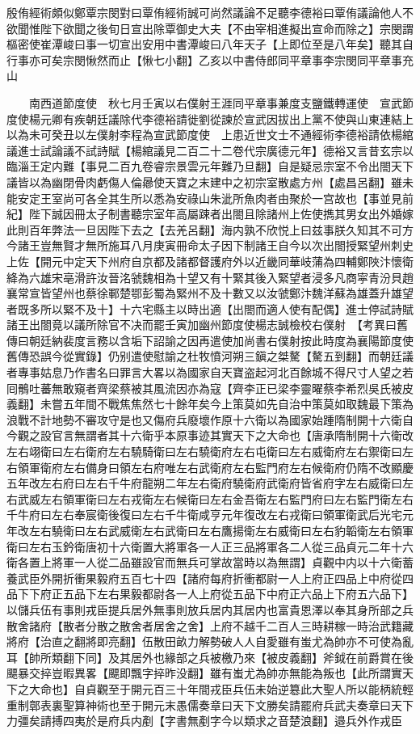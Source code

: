 殷侑經術頗似鄭覃宗閔對曰覃侑經術誠可尚然議論不足聽李德裕曰覃侑議論他人不欲聞惟陛下欲聞之後旬日宣出除覃御史大夫【不由宰相進擬出宣命而除之】宗閔謂樞密使崔潭峻曰事一切宣出安用中書潭峻曰八年天子【上即位至是八年矣】聽其自行事亦可矣宗閔愀然而止【愀七小翻】乙亥以中書侍郎同平章事李宗閔同平章事充山

　　南西道節度使　秋七月壬寅以右僕射王涯同平章事兼度支鹽鐵轉運使　宣武節度使楊元卿有疾朝廷議除代李德裕請徙劉從諫於宣武因拔出上黨不使與山東連結上以為未可癸丑以左僕射李程為宣武節度使　上患近世文士不通經術李德裕請依楊綰議進士試論議不試詩賦【楊綰議見二百二十二卷代宗廣德元年】德裕又言昔玄宗以臨淄王定内難【事見二百九卷睿宗景雲元年難乃旦翻】自是疑忌宗室不令出閤天下議皆以為幽閉骨肉虧傷人倫曏使天寶之末建中之初宗室散處方州【處昌呂翻】雖未能安定王室尚可各全其生所以悉為安祿山朱泚所魚肉者由聚於一宫故也【事並見前紀】陛下誠因冊太子制書聽宗室年高屬踈者出閤且除諸州上佐使擕其男女出外婚嫁此則百年弊法一旦因陛下去之【去羌呂翻】海内孰不欣悦上曰兹事朕久知其不可方今諸王豈無賢才無所施耳八月庚寅冊命太子因下制諸王自今以次出閤授緊望州刺史上佐【開元中定天下州府自京都及諸都督護府外以近畿同華岐蒲為四輔鄭陜汴懷衛絳為六雄宋亳滑許汝晉洺虢魏相為十望又有十緊其後入緊望者浸多凡商寜青汾貝趙襄常宣皆望州也蔡徐鄆楚鄂彭蜀為緊州不及十數又以汝虢鄭汴魏洋蘇為雄蓋升雄望者既多所以緊不及十】十六宅縣主以時出適【出閤而適人使有配偶】進士停試詩賦諸王出閤竟以議所除官不决而罷壬寅加幽州節度使楊志誠檢校右僕射　【考異曰舊傳曰朝廷納裴度言務以含垢下詔諭之因再遣使加尚書右僕射按此時度為襄陽節度使舊傳恐誤今從實錄】仍别遣使慰諭之杜牧憤河朔三鎭之桀驁【驁五到翻】而朝廷議者專事姑息乃作書名曰罪言大畧以為國家自天寶盗起河北百餘城不得尺寸人望之若囘鶻吐蕃無敢窺者齊梁蔡被其風流因亦為寇【齊李正已梁李靈曜蔡李希烈吳氏被皮義翻】未嘗五年間不戰焦焦然七十餘年矣今上策莫如先自治中策莫如取魏最下策為浪戰不計地勢不審攻守是也又傷府兵廢壞作原十六衛以為國家始踵隋制開十六衛自今觀之設官言無謂者其十六衛乎本原事迹其實天下之大命也【唐承隋制開十六衛改左右翊衛曰左右衛府左右驍騎衛曰左右驍衛府左右屯衛曰左右威衛府左右禦衛曰左右領軍衛府左右備身曰領左右府唯左右武衛府左右監門府左右候衛府仍隋不改顯慶五年改左右府曰左右千牛府龍朔二年左右衛府驍衛府武衛府皆省府字左右威衛曰左右武威左右領軍衛曰左右戎衛左右候衛曰左右金吾衛左右監門府曰左右監門衛左右千牛府曰左右奉宸衛後復曰左右千牛衛咸亨元年復改左右戎衛曰領軍衛武后光宅元年改左右驍衛曰左右武威衛左右武衛曰左右鷹揚衛左右威衛曰左右豹韜衛左右領軍衛曰左右玉鈐衛唐初十六衛置大將軍各一人正三品將軍各二人從三品貞元二年十六衛各置上將軍一人從二品雖設官而無兵可掌故當時以為無謂】貞觀中内以十六衛蓄養武臣外開折衝果毅府五百七十四【諸府每府折衝都尉一人上府正四品上中府從四品下下府正五品下左右果毅都尉各一人上府從五品下中府正六品上下府五六品下】以儲兵伍有事則戎臣提兵居外無事則放兵居内其居内也富貴恩澤以奉其身所部之兵散舍諸府【散者分散之散舍者居舍之舍】上府不越千二百人三時耕稼一時治武籍藏將府【治直之翻將即亮翻】伍散田畝力解勢破人人自愛雖有蚩尤為帥亦不可使為亂耳【帥所類翻下同】及其居外也緣部之兵被檄乃來【被皮義翻】斧鉞在前爵賞在後飃暴交捽豈暇異畧【飃即飄字捽昨没翻】雖有蚩尤為帥亦無能為叛也【此所謂實天下之大命也】自貞觀至于開元百三十年間戎臣兵伍未始逆簒此大聖人所以能柄統輕重制鄣表裏聖算神術也至于開元末愚儒奏章曰天下文勝矣請罷府兵武夫奏章曰天下力彊矣請搏四夷於是府兵内剷【字書無剷字今以類求之音楚浪翻】邉兵外作戎臣
